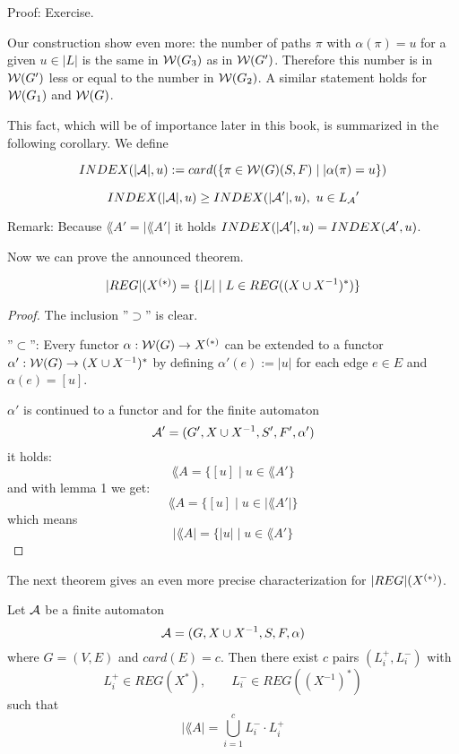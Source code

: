 Proof: Exercise.

Our construction show even more: the number of paths $\pi$ with $\alpha(\pi) =
u$ for a given $u \in |L|$ is the same in $\mbox{$\mathcal{W}(G_3)$}$ as in $\mbox{$\mathcal{W}(G')$}$.
Therefore this number is in $\mbox{$\mathcal{W}(G')$}$ less or equal to the number in
$\mbox{$\mathcal{W}(G_2)$}$. A similar statement holds for $\mbox{$\mathcal{W}(G_1)$}$ and
$\mbox{$\mathcal{W}(G)$}$.

This fact, which will be of importance later in this book, is summarized in the
following corollary. We define

\begin{definition}
\[ INDEX(|\mbox{$\mathcal{A}$}|, u) := card( \{ \pi \in \mbox{$\mathcal{W}(G)$}(S, F) \mid |\alpha(\pi) =
u \} ) \]
\end{definition}

\begin{corollary}
\[ INDEX(|\mbox{$\mathcal{A}$}|, u) \geq INDEX(|\mbox{$\mathcal{A}$}'|, u),\ u \in \mbox{$L_{\mathcal{A}}$}' \]
\end{corollary}

Remark: Because $\lang{A}' = |\lang{A}'|$ it holds $INDEX(|\mbox{$\mathcal{A}$}'|, u) =
INDEX(\mbox{$\mathcal{A}$}', u)$.

Now we can prove the announced theorem.

\begin{theorem}
\[ |REG|(\mbox{${X}^{(*)}$}) = \{ |L| \mid L \in REG((X\cup X^{-1})^*) \} \]
\end{theorem}

\begin{proof}
 The inclusion ''$\supset$'' is clear.
 
 ''$\subset$'': Every functor $\alpha : \mbox{$\mathcal{W}(G)$} \to \mbox{${X}^{(*)}$}$ can be
 extended to a functor $\alpha' : \mbox{$\mathcal{W}(G)$} \to (X \cup X^{-1})^*$ by
 defining $\alpha'(e) := |u|$ for each edge $e \in E$ and $\alpha(e) = [u]$.
 
 $\alpha'$ is continued to a functor and for the finite automaton
 \[ \mbox{$\mathcal{A}$}' = (G', X \cup X^{-1}, S', F', \alpha') \]
 it holds:
 \[ \lang{A} = \{ [u] \mid u \in \lang{A}' \} \]
 and with lemma 1 we get:
 \[ \lang{A} = \{ [u] \mid u \in |\lang{A}'| \} \]
 which means
 \[ |\lang{A}| = \{ |u| \mid u \in \lang{A}' \} \]
\end{proof}

The next theorem gives an even more precise characterization for
$|REG|(\mbox{${X}^{(*)}$})$.

\begin{theorem}
Let $\mbox{$\mathcal{A}$}$ be a finite automaton
\[ \mbox{$\mathcal{A}$} = (G, X \cup X^{-1}, S, F, \alpha) \]
where $G = (V, E)$ and $card(E) = c$. Then there exist $c$ pairs $(L_i^+,
L_i^-)$ with 
\[ L_i^+ \in REG(X^*),\qquad L_i^- \in REG((X^{-1})^*) \]
such that
\[ |\lang{A}| = \bigcup_{i=1}^c L_i^- \cdot L_i^+ \]
\end{theorem}

